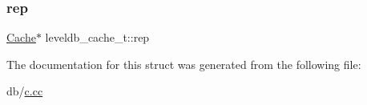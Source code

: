 \subsubsection{\texorpdfstring{rep}{rep}}
{\footnotesize\ttfamily \mbox{\hyperlink{classleveldb_1_1_cache}{Cache}}$\ast$ leveldb\+\_\+cache\+\_\+t\+::rep}



The documentation for this struct was generated from the following file\+:\begin{DoxyCompactItemize}
\item 
db/\mbox{\hyperlink{c_8cc}{c.\+cc}}\end{DoxyCompactItemize}
